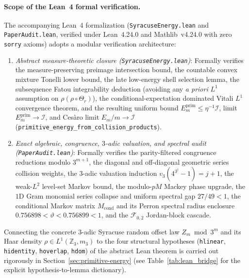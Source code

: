 \documentclass[11pt,a4paper]{article}
\numberwithin{equation}{section}
\theoremstyle{definition}
\theoremstyle{remark}
\newcommand{\Z}{\mathbb{Z}}
\newcommand{\cF}{\mathcal{F}}
\newcommand{\cI}{\mathcal{I}}
\newcommand{\prim}{\mathrm{prim}}
\begin{document}
\paragraph{Scope of the Lean~4 formal verification.}
The accompanying Lean~4 formalization (\texttt{SyracuseEnergy.lean} and \texttt{PaperAudit.lean}, verified under Lean~4.24.0 and Mathlib~v4.24.0 with zero \texttt{sorry} axioms) adopts a modular verification architecture:
\begin{enumerate}[label=(\roman*),topsep=2pt,itemsep=2pt]
\item \emph{Abstract measure-theoretic closure (\texttt{SyracuseEnergy.lean})}: Formally verifies the measure-preserving preimage intersection bound, the countable convex mixture Tonelli lower bound, the late low-energy shell selection lemma, the subsequence Fatou integrability deduction (avoiding any \emph{a priori} $L^1$ assumption on $\rho(\rho\circ\Theta_r)$), the conditional-expectation dominated Vitali $L^1$ convergence theorem, and the resulting uniform bound $E_m^{\prim} \le \eta^{-1}\cI$, limit $E_m^{\prim} \to \cI$, and Ces\`aro limit $E_m/m \to \cI$ (\texttt{primitive\_energy\_from\_collision\_products}).
\item \emph{Exact algebraic, congruence, $3$-adic valuation, and spectral audit (\texttt{PaperAudit.lean})}: Formally verifies the parity-filtered congruence reductions modulo $3^{m+1}$, the diagonal and off-diagonal geometric series collision weights, the $3$-adic valuation induction $v_3(4^{3^j}-1) = j+1$, the weak-$L^2$ level-set Markov bound, the modulo-$pM$ Mackey phase upgrade, the $1$D Gram monomial series collapse and uniform spectral gap $27/49 < 1$, the conditional Markov matrix $M_{\mathrm{cond}}$ and its Perron spectral radius enclosure $0.756898 < \vartheta < 0.756899 < 1$, and the $\cF_{0,2}$ Jordan-block cascade.
\end{enumerate}
Connecting the concrete $3$-adic Syracuse random offset law $Z_m \bmod 3^m$ and its Haar density $\rho \in L^1(\Z_3, m_3)$ to the four structural hypotheses (\texttt{hlinear}, \texttt{hidentity}, \texttt{hoverlap}, \texttt{hdom}) of the abstract Lean theorem is carried out rigorously in Section~\ref{sec:primitive-energy} (see Table~\ref{tab:lean_bridge} for the explicit hypothesis-to-lemma dictionary).
\end{document}

